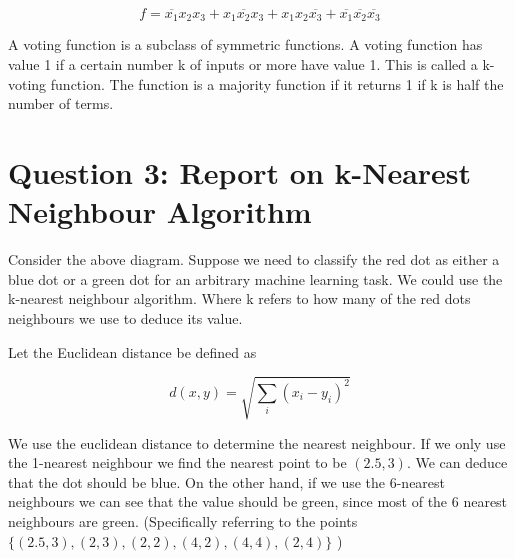 \documentclass[10pt,a4paper]{article}
\begin{document}
\begin{equation}
f = \overline{x_1}x_2x_3 + x_1\overline{x_2}x_3 + x_1x_2\overline{x_3} + \overline{x_1}\overline{x_2}\overline{x_3}
\end{equation}

A voting function is a subclass of symmetric functions. A voting function has value 1 if a certain number k of inputs or more have value 1. This is called a k-voting function. The function is a majority function if it returns 1 if k is half the number of terms. 

\section{Question 3: Report on k-Nearest Neighbour Algorithm}



Consider the above diagram. Suppose we need to classify the red dot as either a blue dot or a green dot for an arbitrary machine learning task. We could use the k-nearest neighbour algorithm. Where k refers to how many of the red dots neighbours we use to deduce its value.

Let the Euclidean distance be defined as

\begin{equation}
d(x,y) = \sqrt{\sum_i (x_i - y_i)^2}
\end{equation}

\citep{was}

We use the euclidean distance to determine the nearest neighbour. If we only use the 1-nearest neighbour we find the nearest point to be $(2.5,3)$. We can deduce that the dot should be blue. On the other hand, if we use the 6-nearest neighbours we can see that the value should be green, since most of the 6 nearest neighbours are green. (Specifically referring to the points $\{(2.5,3),(2,3),(2,2),(4,2),(4,4),(2,4)\}$ )
\end{document}
